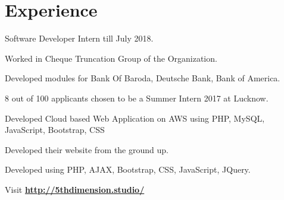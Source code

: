 \documentclass[]{deedy-resume-openfont}
\begin{document}
\begin{minipage}[t]{0.66\textwidth} 


\section{Experience}
\vspace{\topsep} %
\begin{tightemize}
\item Software Developer Intern till July 2018.
\item Worked in Cheque Truncation Group of the Organization. 
\item Developed modules for Bank Of Baroda, Deutsche Bank, Bank of America.
\end{tightemize}
\sectionsep

\vspace{\topsep} %
\begin{tightemize}
\item 8 out of 100 applicants chosen to be a Summer Intern 2017 at Lucknow.
\item Developed Cloud based Web Application on AWS using PHP, MySQL, JavaScript, Bootstrap, CSS
\end{tightemize}
\sectionsep

\begin{tightemize}
\item Developed their website from the ground up.
\item Developed using PHP, AJAX, Bootstrap, CSS, JavaScript, JQuery.
\item Visit \href{http://5thdimension.studio/}{\bf http://5thdimension.studio/} 
\end{tightemize}
\sectionsep




\end{minipage}
\end{document}

